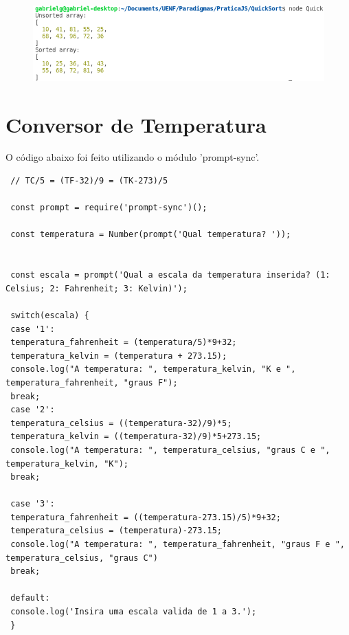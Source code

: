 	\begin{figure}[h]
		\centering
		\includegraphics[width=0.7\linewidth]{Pictures/QuickResult}
		\caption{}
		\label{fig:quickresult}
	\end{figure}
	
	
	
 \section{Conversor de Temperatura}
 O código abaixo foi feito utilizando o módulo 'prompt-sync'.
 \begin{lstlisting}
 // TC/5 = (TF-32)/9 = (TK-273)/5
 
 const prompt = require('prompt-sync')();
 
 const temperatura = Number(prompt('Qual temperatura? '));
 
 
 const escala = prompt('Qual a escala da temperatura inserida? (1: Celsius; 2: Fahrenheit; 3: Kelvin)');
 
 switch(escala) {
 case '1':
 temperatura_fahrenheit = (temperatura/5)*9+32;
 temperatura_kelvin = (temperatura + 273.15);
 console.log("A temperatura: ", temperatura_kelvin, "K e ", temperatura_fahrenheit, "graus F");
 break;
 case '2':
 temperatura_celsius = ((temperatura-32)/9)*5;
 temperatura_kelvin = ((temperatura-32)/9)*5+273.15;
 console.log("A temperatura: ", temperatura_celsius, "graus C e ", temperatura_kelvin, "K");
 break;
 
 case '3':
 temperatura_fahrenheit = ((temperatura-273.15)/5)*9+32;
 temperatura_celsius = (temperatura)-273.15;
 console.log("A temperatura: ", temperatura_fahrenheit, "graus F e ", temperatura_celsius, "graus C")
 break;
 
 default:
 console.log('Insira uma escala valida de 1 a 3.');
 }
 \end{lstlisting}
 

